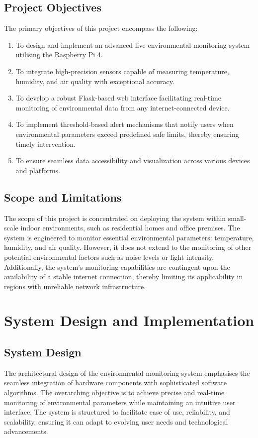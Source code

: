 \documentclass[a4paper, 12pt]{report}
\begin{document}
\subsection{Project Objectives}
The primary objectives of this project encompass the following:
\begin{enumerate}
    \item To design and implement an advanced live environmental monitoring system utilising the Raspberry Pi 4.
    \item To integrate high-precision sensors capable of measuring temperature, humidity, and air quality with exceptional accuracy.
    \item To develop a robust Flask-based web interface facilitating real-time monitoring of environmental data from any internet-connected device.
    \item To implement threshold-based alert mechanisms that notify users when environmental parameters exceed predefined safe limits, thereby ensuring timely intervention.
    \item To ensure seamless data accessibility and visualization across various devices and platforms.
\end{enumerate}

\subsection{Scope and Limitations}
The scope of this project is concentrated on deploying the system within small-scale indoor environments, such as residential homes and office premises. The system is engineered to monitor essential environmental parameters: temperature, humidity, and air quality. However, it does not extend to the monitoring of other potential environmental factors such as noise levels or light intensity. Additionally, the system's monitoring capabilities are contingent upon the availability of a stable internet connection, thereby limiting its applicability in regions with unreliable network infrastructure.

\section{System Design and Implementation}
\subsection{System Design}
The architectural design of the environmental monitoring system emphasises the seamless integration of hardware components with sophisticated software algorithms. The overarching objective is to achieve precise and real-time monitoring of environmental parameters while maintaining an intuitive user interface. The system is structured to facilitate ease of use, reliability, and scalability, ensuring it can adapt to evolving user needs and technological advancements.
\end{document}
